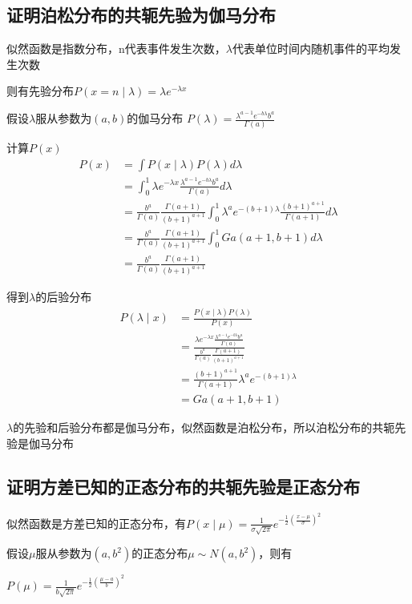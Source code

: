 \documentclass[12pt, a4paper, oneside, fontset=windows]{ctexart}
\begin{document}
\subsection{证明泊松分布的共轭先验为伽马分布}
似然函数是指数分布，n代表事件发生次数，$\lambda$代表单位时间内随机事件的平均发生次数

则有先验分布$P(x = n \mid \lambda) = \lambda e^{-\lambda x}$

假设$\lambda$服从参数为$(a,b)$的伽马分布
$P(\lambda) = \frac{\lambda^{a-1}e^{-b \lambda}b^a}{\Gamma(a)}$

计算$P(x)$
\begin{align*}
    P(x) &= \int P(x \mid \lambda) P(\lambda) d\lambda\\
    &=\int_0^1 \lambda e^{-\lambda x}\frac{\lambda^{a-1}e^{-b \lambda} b^a}{\Gamma(a)} d\lambda\\
    &=\frac{b^a}{\Gamma(a)}\frac{\Gamma(a+1)}{(b+1)^{a+1}} \int_0^1 \lambda^{a} e^{-(b+1)\lambda} \frac{(b+1)^{a+1}}{\Gamma(a+1)} d\lambda\\
    &= \frac{b^a}{\Gamma(a)}\frac{\Gamma(a+1)}{(b+1)^{a+1}} \int_0^1 Ga(a+1,b+1) d\lambda\\
    &= \frac{b^a}{\Gamma(a)}\frac{\Gamma(a+1)}{(b+1)^{a+1}}
\end{align*}

得到$\lambda$的后验分布
\begin{align*}
    P(\lambda \mid x) &= \frac{P(x \mid \lambda)P(\lambda)}{P(x)}\\
    &=\frac{\lambda e^{-\lambda x}\frac{\lambda^{a-1}e^{-b \lambda} b^a}{\Gamma(a)}}{\frac{b^a}{\Gamma(a)}\frac{\Gamma(a+1)}{(b+1)^{a+1}}}\\
    &=\frac{(b+1)^{a+1}}{\Gamma(a+1)}\lambda^{a} e^{-(b+1)\lambda}\\
    &=Ga(a+1,b+1)
\end{align*}

$\lambda$的先验和后验分布都是伽马分布，似然函数是泊松分布，所以泊松分布的共轭先验是伽马分布
\subsection{证明方差已知的正态分布的共轭先验是正态分布}
似然函数是方差已知的正态分布，有$P(x \mid \mu)=\frac{1}{\sigma \sqrt{2 \pi}} e^{-\frac{1}{2}\left(\frac{x-\mu}{\sigma}\right)^{2}}$

假设$\mu$服从参数为$(a,b^2)$的正态分布$\mu\sim N(a,b^2)$，则有

$P(\mu)=\frac{1}{b \sqrt{2 \pi}} e^{-\frac{1}{2}\left(\frac{\mu-a}{b}\right)^{2}}$
\end{document}
